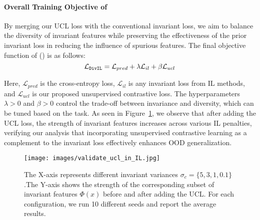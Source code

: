\paragraph{Overall Training Objective of \ours} 
By merging our UCL loss with the conventional invariant loss, we aim to balance the diversity of invariant features while preserving the effectiveness of the prior invariant loss in reducing the influence of spurious features.
The final objective function of \oursfull (\ours) is as follows:
\begin{equation} 
\label{eq: divil}
\mathcal{L}_{\texttt{DivIL}}=\mathcal{L}_{pred}+\lambda \mathcal{L}_{il}+\beta \mathcal{L}_{ucl} 
\end{equation}

Here, $\mathcal{L}_{pred}$ is the cross-entropy loss, $\mathcal{L}_{il}$ is any invariant loss from IL methods, and $\mathcal{L}_{ucl}$ is our proposed unsupervised contrastive loss. 
The hyperparameters $\lambda > 0$ and $\beta > 0$ control the trade-off between invariance and diversity, which can be tuned based on the task.
As seen in Figure~\ref{fig:IRM&UCL}, we observe that after adding the UCL loss, the strength of invariant features increases across various IL penalties, verifying our analysis that incorporating unsupervised contrastive learning as a complement to the invariant loss effectively enhances OOD generalization.







\begin{figure}[t]
	\centering
	\texttt{[image: images/validate\_ucl\_in\_IL.jpg]}
	\caption{
     The X-axis represents different invariant variances $\sigma_c = \{5,3,1,0.1\}$.The Y-axis shows the strength of the corresponding subset of invariant features $\Phi(x)$ before and after adding the UCL. For each configuration, we run 10 different seeds and report the average results.
 }
	\label{fig:IRM&UCL}
\end{figure}





